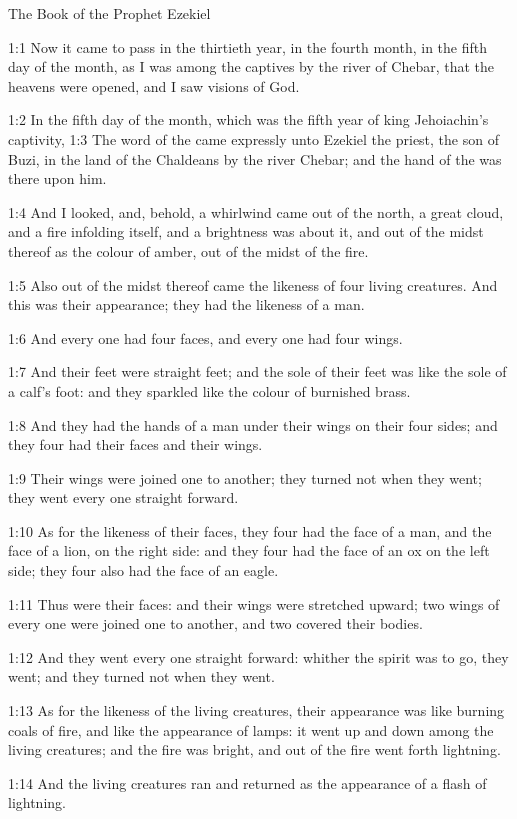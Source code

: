 The Book of the Prophet Ezekiel


1:1 Now it came to pass in the thirtieth year, in the fourth month, in the fifth day of the month, as I was among the captives by the river of Chebar, that the heavens were opened, and I saw visions of God.

1:2 In the fifth day of the month, which was the fifth year of king Jehoiachin's captivity, 1:3 The word of the \LORD came expressly unto Ezekiel the priest, the son of Buzi, in the land of the Chaldeans by the river Chebar; and the hand of the \LORD was there upon him.

1:4 And I looked, and, behold, a whirlwind came out of the north, a great cloud, and a fire infolding itself, and a brightness was about it, and out of the midst thereof as the colour of amber, out of the midst of the fire.

1:5 Also out of the midst thereof came the likeness of four living creatures. And this was their appearance; they had the likeness of a man.

1:6 And every one had four faces, and every one had four wings.

1:7 And their feet were straight feet; and the sole of their feet was like the sole of a calf's foot: and they sparkled like the colour of burnished brass.

1:8 And they had the hands of a man under their wings on their four sides; and they four had their faces and their wings.

1:9 Their wings were joined one to another; they turned not when they went; they went every one straight forward.

1:10 As for the likeness of their faces, they four had the face of a man, and the face of a lion, on the right side: and they four had the face of an ox on the left side; they four also had the face of an eagle.

1:11 Thus were their faces: and their wings were stretched upward; two wings of every one were joined one to another, and two covered their bodies.

1:12 And they went every one straight forward: whither the spirit was to go, they went; and they turned not when they went.

1:13 As for the likeness of the living creatures, their appearance was like burning coals of fire, and like the appearance of lamps: it went up and down among the living creatures; and the fire was bright, and out of the fire went forth lightning.

1:14 And the living creatures ran and returned as the appearance of a flash of lightning.

